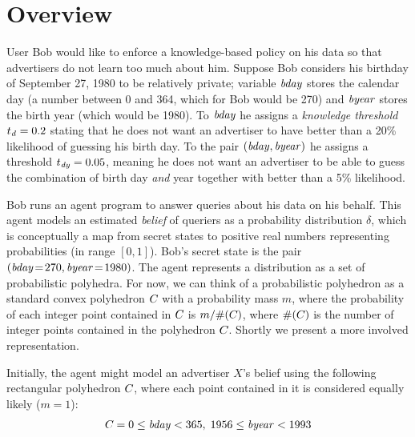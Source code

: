 \section{Overview}
\label{sec:overview}

  User Bob would
like to enforce a knowledge-based policy on his data so that
advertisers do not learn too much about him.  Suppose Bob considers
his birthday of September 27, 1980 to be relatively private; variable
$\mathit{bday}$ stores the calendar day (a number between 0 and 364,
which for Bob would be 270) and
$\mathit{byear}$ stores the birth year (which would be 1980).  To
$\mathit{bday}$ he assigns a \emph{knowledge threshold} $t_{\mathit{d}} =
0.2$ stating that he does not want an advertiser to have better than a
20\% likelihood of guessing his birth day.  To the pair
$(\mathit{bday},\mathit{byear})$ he assigns a threshold $t_{\mathit{dy}} =
0.05$, meaning he does not want an advertiser to be able to guess the
combination of birth day \emph{and} year together with better than a
5\% likelihood.

Bob runs an agent program to answer queries about his data on his
behalf.  This agent models an estimated \emph{belief} of queriers as a
probability distribution $\delta$, which is conceptually a map from
secret states to positive real numbers representing probabilities (in
range $[0,1]$).  Bob's secret state is the pair $(\mathit{bday}\! =\!
270,\mathit{byear}\! =\! 1980)$.  The agent represents a distribution as a
set of probabilistic polyhedra.  For now, we can think of a
probabilistic polyhedron as a standard convex polyhedron $C_{}$
with a probability mass $m$, where the probability of each integer
point contained in $C_{}$ is $m / \#(C_{})$, where
$\#(C_{})$ is the number of integer points contained in the
polyhedron $C_{}$.  Shortly we present a more involved
representation.

Initially, the agent might model an advertiser $X$'s belief using the
following rectangular polyhedron $C_{}$, where each point
contained in it is considered equally likely ($m = 1$):
$$
\begin{array}{l}
C_{} = 0 \leq \mathit{bday} < 365,\; 1956 \leq \mathit{byear} < 1993
\end{array}
$$

